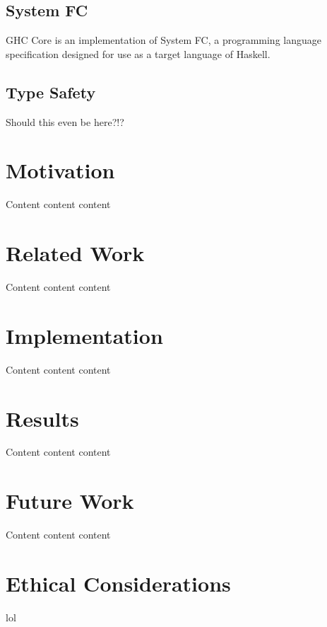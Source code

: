 \documentclass{sig-alternate}
\begin{document}
\subsection{System FC}
\label{sec:background-fc}

GHC Core is an implementation of System FC, a programming language specification designed for use as a target language of Haskell. 

\subsection{Type Safety}
\label{sec:background-type-safety}

Should this even be here?!?

\section{Motivation}
\label{sec:motivation}

Content content content

\section{Related Work}
\label{sec:related-work}

Content content content

\section{Implementation}
\label{sec:implementation}

Content content content

\section{Results}
\label{sec:results}

Content content content

\section{Future Work}
\label{sec:future-work}

Content content content

\section{Ethical Considerations}
\label{sec:ethics}

lol
\end{document}
